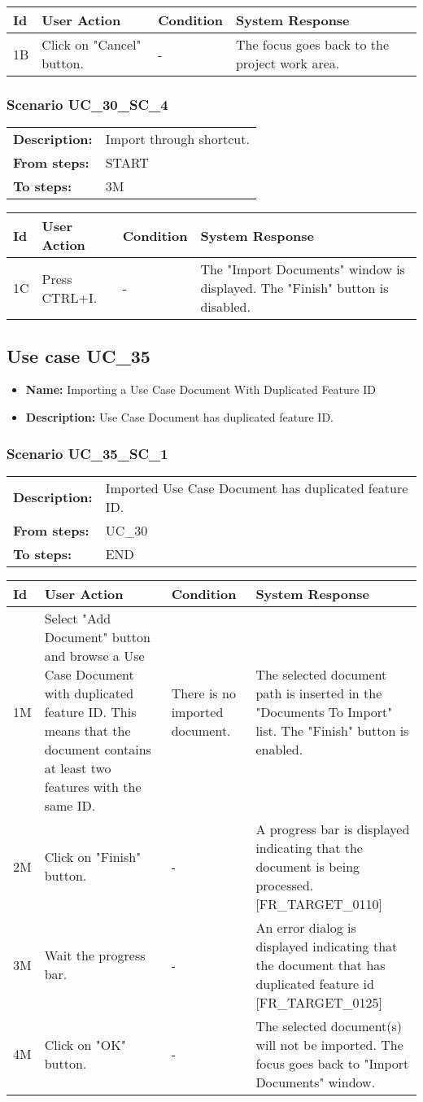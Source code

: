 \documentclass[a4paper,11pt]{article}
\newcommand{\bl}{\\ \hline}
\begin{document}
\begin{tabular}{|p{0.8in}|p{1.6in}|p{1.6in}|p{1.6in}|}
\hline
Id & User Action & Condition & System Response  \bl 
1B & Click on "Cancel" button. & - & The focus goes back to the project work area. \bl 
\end{tabular}
\subsubsection*{Scenario UC_30_SC_4}
\begin{tabular}{p{1in}p{4in}}
{\bf Description:} & Import through shortcut. \\
{\bf From steps:} & START \\
{\bf To steps:} & 3M \\
\end{tabular}
 
\begin{tabular}{|p{0.8in}|p{1.6in}|p{1.6in}|p{1.6in}|}
\hline
Id & User Action & Condition & System Response  \bl 
1C & Press CTRL+I. & - & The "Import Documents" window is displayed. The "Finish" button is disabled. \bl 
\end{tabular}
\subsection*{Use case UC_35}
\begin{itemize}
\item {\bf Name: }Importing a Use Case Document With Duplicated Feature ID
\item {\bf Description: }Use Case Document has duplicated feature ID.
\end{itemize}
\subsubsection*{Scenario UC_35_SC_1}
\begin{tabular}{p{1in}p{4in}}
{\bf Description:} & Imported Use Case Document has duplicated feature ID. \\
{\bf From steps:} & UC_30#2M \\
{\bf To steps:} & END \\
\end{tabular}
 
\begin{tabular}{|p{0.8in}|p{1.6in}|p{1.6in}|p{1.6in}|}
\hline
Id & User Action & Condition & System Response  \bl 
1M & Select "Add Document" button and browse a Use Case Document with duplicated feature ID. This means that the document contains at least two features with the same ID. & There is no imported document. & The selected document path is inserted in the "Documents To Import" list. The "Finish" button is enabled. \bl 
2M & Click on "Finish" button. & - & A progress bar is displayed indicating that the document is being processed. [FR_TARGET_0110] \bl 
3M & Wait the progress bar. & - & An error dialog is displayed indicating that the document that has duplicated feature id [FR_TARGET_0125] \bl 
4M & Click on "OK" button. & - & The selected document(s) will not be imported. The focus goes back to "Import Documents" window. \bl 
\end{tabular}
\end{document}
